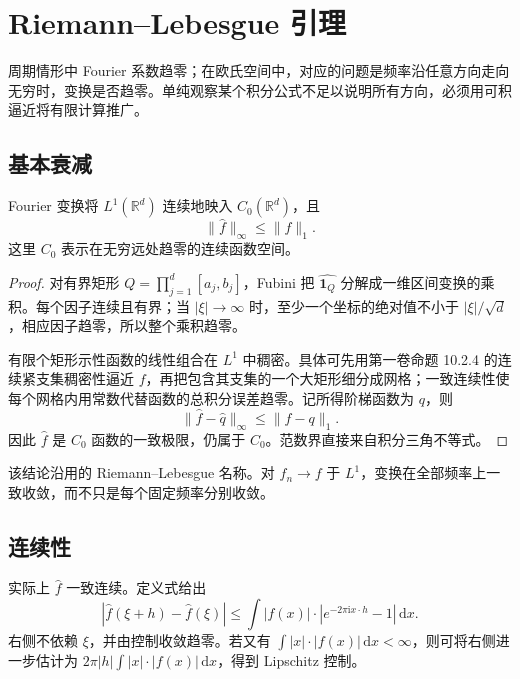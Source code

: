 \section{Riemann--Lebesgue 引理}
\label{b2:sec:0302}

周期情形中 Fourier 系数趋零；在欧氏空间中，对应的问题是频率沿任意方向走向无穷时，变换是否趋零。单纯观察某个积分公式不足以说明所有方向，必须用可积逼近将有限计算推广。

\subsection{基本衰减}
\label{b2:subsec:030201}

\begin{theorem}\label{b2:thm:03-riemann-lebesgue}
Fourier 变换将 \(L^1(\mathbb R^d)\) 连续地映入 \(C_0(\mathbb R^d)\)，且
\[
 \|\widehat f\|_\infty\leq\|f\|_1.
\]
这里 \(C_0\) 表示在无穷远处趋零的连续函数空间。
\end{theorem}
\begin{proof}
对有界矩形 \(Q=\prod_{j=1}^d[a_j,b_j]\)，Fubini 把 \(\widehat{\mathbf1_Q}\) 分解成一维区间变换的乘积。每个因子连续且有界；当 \(|\xi|\to\infty\) 时，至少一个坐标的绝对值不小于 \(|\xi|/\sqrt d\)，相应因子趋零，所以整个乘积趋零。

有限个矩形示性函数的线性组合在 \(L^1\) 中稠密。具体可先用第一卷命题 10.2.4 的连续紧支集稠密性逼近 \(f\)，再把包含其支集的一个大矩形细分成网格；一致连续性使每个网格内用常数代替函数的总积分误差趋零。记所得阶梯函数为 \(q\)，则
\[
 \|\widehat f-\widehat q\|_\infty\leq\|f-q\|_1.
\]
因此 \(\widehat f\) 是 \(C_0\) 函数的一致极限，仍属于 \(C_0\)。范数界直接来自积分三角不等式。
\end{proof}

该结论沿用的 Riemann--Lebesgue 名称。对 \(f_n\to f\) 于 \(L^1\)，变换在全部频率上一致收敛，而不只是每个固定频率分别收敛。

\subsection{连续性}
\label{b2:subsec:030202}

实际上 \(\widehat f\) 一致连续。定义式给出
\[
 |\widehat f(\xi+h)-\widehat f(\xi)|
 \leq\int|f(x)|\cdot|e^{-2\pi\mathrm{i}x\cdot h}-1|\,\mathrm{d}x.
\]
右侧不依赖 \(\xi\)，并由控制收敛趋零。若又有 \(\int|x|\cdot|f(x)|\,\mathrm{d}x<\infty\)，则可将右侧进一步估计为 \(2\pi|h|\int|x|\cdot|f(x)|\,\mathrm{d}x\)，得到 Lipschitz 控制。

